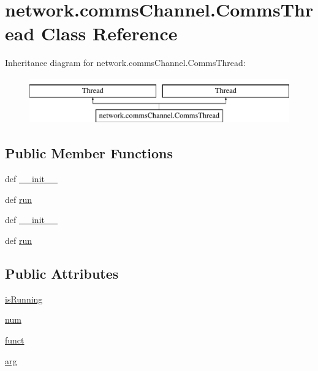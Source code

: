 \hypertarget{classnetwork_1_1commsChannel_1_1CommsThread}{}\section{network.\+comms\+Channel.\+Comms\+Thread Class Reference}
\label{classnetwork_1_1commsChannel_1_1CommsThread}
Inheritance diagram for network.\+comms\+Channel.\+Comms\+Thread\+:\begin{figure}[H]
\begin{center}
\leavevmode
\includegraphics[height=2.000000cm]{classnetwork_1_1commsChannel_1_1CommsThread}
\end{center}
\end{figure}
\subsection*{Public Member Functions}
\begin{DoxyCompactItemize}
\item 
def \hyperlink{classnetwork_1_1commsChannel_1_1CommsThread_a1a23f3e9d80d65392dc9c2710c95443a}{\+\_\+\+\_\+init\+\_\+\+\_\+}
\item 
def \hyperlink{classnetwork_1_1commsChannel_1_1CommsThread_a80d7c1196d9c22fa9b5c892187f0fda9}{run}
\item 
def \hyperlink{classnetwork_1_1commsChannel_1_1CommsThread_a1a23f3e9d80d65392dc9c2710c95443a}{\+\_\+\+\_\+init\+\_\+\+\_\+}
\item 
def \hyperlink{classnetwork_1_1commsChannel_1_1CommsThread_a80d7c1196d9c22fa9b5c892187f0fda9}{run}
\end{DoxyCompactItemize}
\subsection*{Public Attributes}
\begin{DoxyCompactItemize}
\item 
\hyperlink{classnetwork_1_1commsChannel_1_1CommsThread_a19b489cfef0f927e73c891f06f971745}{is\+Running}
\item 
\hyperlink{classnetwork_1_1commsChannel_1_1CommsThread_a2201049bdb76e1bff371c2ef1446eeb6}{num}
\item 
\hyperlink{classnetwork_1_1commsChannel_1_1CommsThread_a84740c23a68c30c4ae6596cb4a023661}{funct}
\item 
\hyperlink{classnetwork_1_1commsChannel_1_1CommsThread_aca064a0602473a73a38ba33d335ebfd2}{arg}
\end{DoxyCompactItemize}


